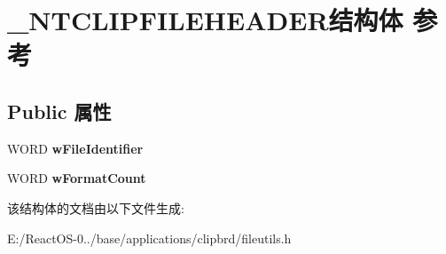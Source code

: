 \hypertarget{struct___n_t_c_l_i_p_f_i_l_e_h_e_a_d_e_r}{}\section{\+\_\+\+N\+T\+C\+L\+I\+P\+F\+I\+L\+E\+H\+E\+A\+D\+E\+R结构体 参考}
\label{struct___n_t_c_l_i_p_f_i_l_e_h_e_a_d_e_r}
\subsection*{Public 属性}
\begin{DoxyCompactItemize}
\item 
\mbox{\label{struct___n_t_c_l_i_p_f_i_l_e_h_e_a_d_e_r_a0a766c9ecc3388808affa8a076ee317d}} 
W\+O\+RD {\bfseries w\+File\+Identifier}
\item 
\mbox{\label{struct___n_t_c_l_i_p_f_i_l_e_h_e_a_d_e_r_aeeec93e7c7afa76a5c63f9fed94450cf}} 
W\+O\+RD {\bfseries w\+Format\+Count}
\end{DoxyCompactItemize}


该结构体的文档由以下文件生成\+:\begin{DoxyCompactItemize}
\item 
E\+:/\+React\+O\+S-\/0../base/applications/clipbrd/fileutils.\+h\end{DoxyCompactItemize}
